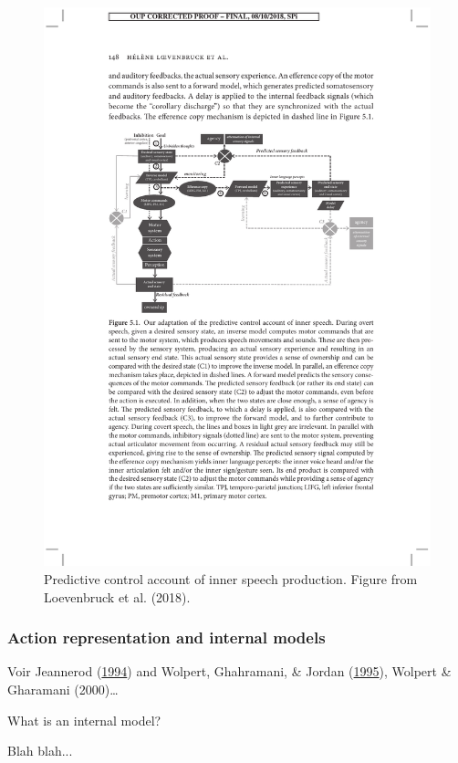 \documentclass[a4paper,12pt,twoside,openright,oldfontcommands]{memoir}
\begin{document}
\begin{figure}[H]

{\centering \includegraphics[width=0.75\linewidth]{assets/loevenbruck} 

}

\caption{Predictive control account of inner speech production. Figure from Loevenbruck et al. (2018).}\label{fig:loevenbruck}
\end{figure}

\hypertarget{action-representation-and-internal-models}{%
\subsubsection{Action representation and internal models}\label{action-representation-and-internal-models}}

Voir Jeannerod (\protect\hyperlink{ref-jeannerod_representing_1994}{1994}) and Wolpert, Ghahramani, \& Jordan (\protect\hyperlink{ref-wolpert_internal_1995}{1995}), Wolpert \& Gharamani (2000)\ldots{}

\vspace{2mm}

\begin{mybox}[label = model]{What is an internal model?}

Blah blah...

\end{mybox}
\end{document}
